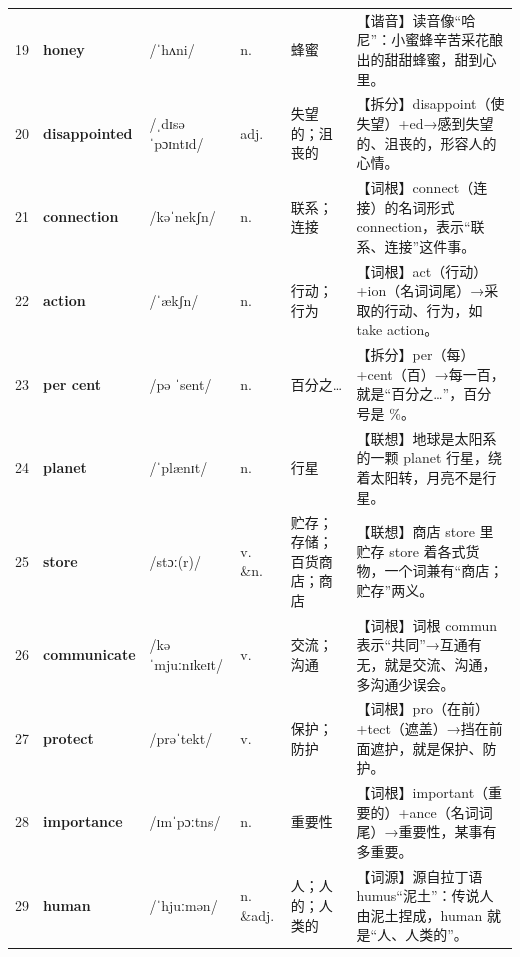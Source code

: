 \documentclass[UTF8,a4paper,11pt,oneside]{ctexbook}
\newcommand{\cellword}[1]{{\bfseries\textcolor{wordcol}{#1}}}
\newcommand{\cellipa}[1]{{\footnotesize\textcolor{ipacol}{#1}}}
\newcommand{\cellpos}[1]{\textcolor{poscol}{#1}}
\newcommand{\cellno}[1]{\textcolor{volcolor!75!black}{#1}}
\begin{document}
{\begin{longtable}{@{}C{0.045\textwidth}L{0.155\textwidth}L{0.175\textwidth}C{0.070\textwidth}L{0.180\textwidth}L{0.282\textwidth}@{}}
 \cellno{19} & \cellword{honey} & \cellipa{/ˈhʌni/} & \cellpos{n.} & 蜂蜜 & \textcolor{tagSound}{【谐音】}读音像“哈尼”：小蜜蜂辛苦采花酿出的甜甜蜂蜜，甜到心里。 \\
\cellno{20} & \cellword{disappointed} & \cellipa{/ˌdɪsəˈpɔɪntɪd/} & \cellpos{adj.} & 失望的；沮丧的 & \textcolor{tagSplit}{【拆分】}disappoint（使失望）+ed→\allowbreak{}感到失望的、沮丧的，形容人的心情。 \\
 \cellno{21} & \cellword{connection} & \cellipa{/kəˈnekʃn/} & \cellpos{n.} & 联系；连接 & \textcolor{tagRoot}{【词根】}connect（连接）的名词形式 connection，表示“联系、连接”这件事。 \\
\cellno{22} & \cellword{action} & \cellipa{/ˈækʃn/} & \cellpos{n.} & 行动；行为 & \textcolor{tagRoot}{【词根】}act（行动）+ion（名词词尾）→\allowbreak{}采取的行动、行为，如 take action。 \\
 \cellno{23} & \cellword{per cent} & \cellipa{/pə ˈsent/} & \cellpos{n.} & 百分之… & \textcolor{tagSplit}{【拆分】}per（每）+cent（百）→\allowbreak{}每一百，就是“百分之…”，百分号是 \%。 \\
\cellno{24} & \cellword{planet} & \cellipa{/ˈplænɪt/} & \cellpos{n.} & 行星 & \textcolor{tagAssoc}{【联想】}地球是太阳系的一颗 planet 行星，绕着太阳转，月亮不是行星。 \\
 \cellno{25} & \cellword{store} & \cellipa{/stɔː(r)/} & \cellpos{v. \&n.} & 贮存；存储；百货商店；商店 & \textcolor{tagAssoc}{【联想】}商店 store 里贮存 store 着各式货物，一个词兼有“商店；贮存”两义。 \\
\cellno{26} & \cellword{communicate} & \cellipa{/kəˈmjuːnɪkeɪt/} & \cellpos{v.} & 交流；沟通 & \textcolor{tagRoot}{【词根】}词根 commun 表示“共同”→\allowbreak{}互通有无，就是交流、沟通，多沟通少误会。 \\
 \cellno{27} & \cellword{protect} & \cellipa{/prəˈtekt/} & \cellpos{v.} & 保护；防护 & \textcolor{tagRoot}{【词根】}pro（在前）+tect（遮盖）→\allowbreak{}挡在前面遮护，就是保护、防护。 \\
\cellno{28} & \cellword{importance} & \cellipa{/ɪmˈpɔːtns/} & \cellpos{n.} & 重要性 & \textcolor{tagRoot}{【词根】}important（重要的）+ance（名词词尾）→\allowbreak{}重要性，某事有多重要。 \\
 \cellno{29} & \cellword{human} & \cellipa{/ˈhjuːmən/} & \cellpos{n. \&adj.} & 人；人的；人类的 & \textcolor{tagEtym}{【词源】}源自拉丁语 humus“泥土”：传说人由泥土捏成，human 就是“人、人类的”。 \\

\end{longtable}}
\end{document}
